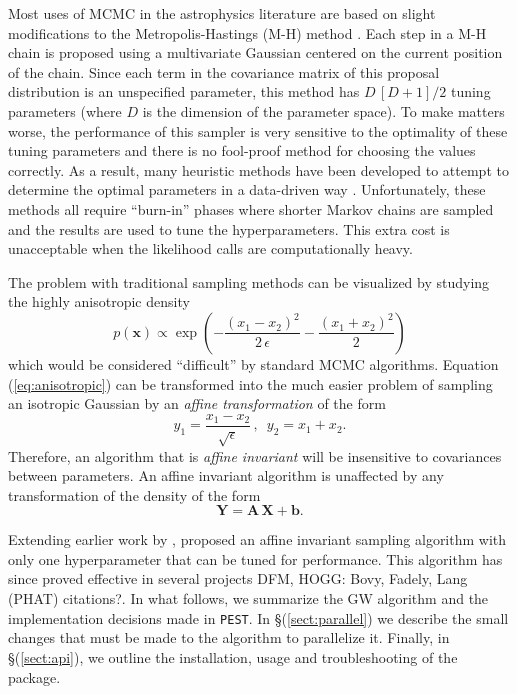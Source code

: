 \documentclass[12pt,preprint]{aastex}
\newcommand{\project}[1]{\texttt{#1}}
\newcommand{\this}{\project{PEST}}
\newcommand{\Eq}[1]{Equation (\ref{eq:#1})}
\newcommand{\eqlabel}[1]{\label{eq:#1}}
\newcommand{\sect}[1]{\S (\ref{sect:#1})}
\begin{document}
Most uses of MCMC in the astrophysics literature are based on slight
modifications to the Metropolis-Hastings (M-H) method
\citep[e.g.][]{MacKay:2003}. Each step in a M-H chain is proposed using a
multivariate Gaussian centered on the current position of the chain. Since
each term in the covariance matrix of this proposal distribution is an
unspecified parameter, this method has $D\,[D+1]/2$ tuning parameters (where
$D$ is the dimension of the parameter space).  To make matters worse, the
performance of this sampler is very sensitive to the optimality of these
tuning parameters and there is no fool-proof method for choosing the values
correctly. As a result, many heuristic methods have been developed to attempt
to determine the optimal parameters in a data-driven way
\citep[e.g.][]{Gregory:2005,Dunkley:2005,Widrow:2008}. Unfortunately, these
methods all require ``burn-in'' phases where shorter Markov chains
are sampled and the results are used to tune the hyperparameters. This extra
cost is unacceptable when the likelihood calls are computationally heavy.

The problem with traditional sampling methods can be visualized by studying
the highly anisotropic density
\begin{equation}
    \eqlabel{anisotropic}
    p(\mathbf{x}) \propto \exp \left (-\frac{(x_1-x_2)^2}{2\,\epsilon}
                                        - \frac{(x_1+x_2)^2}{2} \right )
\end{equation}
which would be considered ``difficult'' by standard MCMC algorithms.
\Eq{anisotropic} can be transformed into the much easier problem of sampling
an isotropic Gaussian by an \emph{affine transformation} of the form
\begin{equation}
    y_1 = \frac{x_1-x_2}{\sqrt{\epsilon}} \, , \,\,\, y_2 = x_1 + x_2.
\end{equation}
Therefore, an algorithm that is \emph{affine invariant} will be insensitive to
covariances between parameters. An affine invariant algorithm is unaffected by
any transformation of the density of the form
\begin{equation}
    \mathbf{Y} = \mathbf{A}\, \mathbf{X} + \mathbf{b}.
\end{equation}

Extending earlier work by \citet{Christen:2007},
\citet[][hereafter GW]{Goodman:2010} proposed an affine invariant sampling
algorithm with only one hyperparameter that can be tuned for performance.
This algorithm has since proved effective in several projects
\citep[e.g.][Foreman-Mackey \& Widrow~2012, in prep.]{Hou:2011, Lang:2011}
DFM, HOGG: Bovy, Fadely, Lang (PHAT) citations?.
In what follows, we summarize the GW algorithm and the implementation
decisions made in \this. In \sect{parallel} we describe the small changes
that must be made to the algorithm to parallelize it. Finally, in \sect{api},
we outline the installation, usage and troubleshooting of the package.
\end{document}
